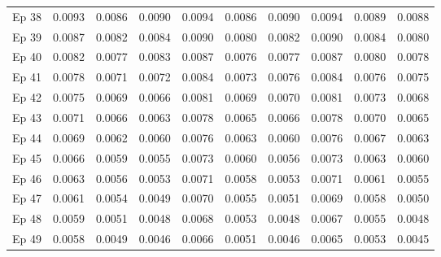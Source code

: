 \begin{table}[htbp]
\begin{tabular}{|l|l|l|l|l|l|l|l|l|l|}
Ep 38 & 0.0093 & 0.0086 & 0.0090 & 0.0094 & 0.0086 & 0.0090 & 0.0094 & 0.0089 & 0.0088  \\
Ep 39 & 0.0087 & 0.0082 & 0.0084 & 0.0090 & 0.0080 & 0.0082 & 0.0090 & 0.0084 & 0.0080  \\
Ep 40 & 0.0082 & 0.0077 & 0.0083 & 0.0087 & 0.0076 & 0.0077 & 0.0087 & 0.0080 & 0.0078  \\
Ep 41 & 0.0078 & 0.0071 & 0.0072 & 0.0084 & 0.0073 & 0.0076 & 0.0084 & 0.0076 & 0.0075  \\
Ep 42 & 0.0075 & 0.0069 & 0.0066 & 0.0081 & 0.0069 & 0.0070 & 0.0081 & 0.0073 & 0.0068  \\
Ep 43 & 0.0071 & 0.0066 & 0.0063 & 0.0078 & 0.0065 & 0.0066 & 0.0078 & 0.0070 & 0.0065  \\
Ep 44 & 0.0069 & 0.0062 & 0.0060 & 0.0076 & 0.0063 & 0.0060 & 0.0076 & 0.0067 & 0.0063  \\
Ep 45 & 0.0066 & 0.0059 & 0.0055 & 0.0073 & 0.0060 & 0.0056 & 0.0073 & 0.0063 & 0.0060  \\
Ep 46 & 0.0063 & 0.0056 & 0.0053 & 0.0071 & 0.0058 & 0.0053 & 0.0071 & 0.0061 & 0.0055  \\
Ep 47 & 0.0061 & 0.0054 & 0.0049 & 0.0070 & 0.0055 & 0.0051 & 0.0069 & 0.0058 & 0.0050  \\
Ep 48 & 0.0059 & 0.0051 & 0.0048 & 0.0068 & 0.0053 & 0.0048 & 0.0067 & 0.0055 & 0.0048  \\
Ep 49 & 0.0058 & 0.0049 & 0.0046 & 0.0066 & 0.0051 & 0.0046 & 0.0065 & 0.0053 & 0.0045  \\
\hline
\end{tabular}
\end{table}